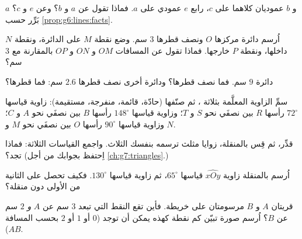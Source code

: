\begin{exercise}[$\star$]\label{exo:g6:lines:4}
 $a$ و $b$ عموديان كلاهما على  $c$،  رابع
$e$ عمودي على $a$. فماذا تقول عن $a$ و $b$؟
وعن $e$ و $c$؟ بَرِّر حسب \cref{prop:g6:lines:facts}.
\end{exercise}

\begin{exercise}[$\star$]\label{exo:g6:lines:5}
اُرسم دائرة مركزها $O$ ونصف قطرها $3$ سم. وضع نقطة $M$ على
الدائرة، ونقطة $N$ داخلها، ونقطة $P$ خارجها. فماذا تقول
عن المسافات $OM$ و $ON$ و $OP$ بالمقارنة مع $3$ سم؟
\end{exercise}

\begin{exercise}[$\star$]\label{exo:g6:lines:6}
 دائرة $9$ سم. فما نصف قطرها؟ ودائرة أخرى نصف قطرها
$2.6$ سم: فما قطرها؟
\end{exercise}

\begin{exercise}[$\star$]\label{exo:g6:lines:7}
سمِّ الزاوية المعلَّمة بثلاثة ، ثم صنّفها (حادّة، قائمة،
منفرجة، مستقيمة): زاوية قياسها $72^\circ$ رأسها $R$ بين نصفَي 
نحو $S$ و $T$؛ وزاوية قياسها $148^\circ$ رأسها $B$ بين نصفَي 
نحو $A$ و $C$؛ وزاوية قياسها $90^\circ$ رأسها $O$ بين نصفَي 
نحو $M$ و $N$.
\end{exercise}

\begin{exercise}[$\star$]\label{exo:g6:lines:8}
قدِّر، ثم قِس بالمنقلة، زوايا مثلث ترسمه بنفسك الثلاث.
واجمع القياسات الثلاثة: فماذا تجد؟
(اِحتفظ بجوابك من أجل \cref{ch:g7:triangles}.)
\end{exercise}

\begin{exercise}[$\star$]\label{exo:g6:lines:9}
اُرسم بالمنقلة زاوية $\widehat{xOy}$ قياسها $65^\circ$، ثم
زاوية قياسها $130^\circ$. فكيف تحصل على الثانية من الأولى
دون منقلة؟
\end{exercise}

\begin{exercise}[$\star\star$]\label{exo:g6:lines:10}
قريتان $A$ و $B$ مرسومتان على خريطة. فأين تقع النقط التي
تبعد $3$ سم عن $A$ \emph{و} $2$ سم عن $B$؟ اُرسم صورة
تبيّن كم نقطة كهذه يمكن أن توجد ($0$ أو $1$ أو $2$ بحسب
المسافة $AB$).
\end{exercise}

